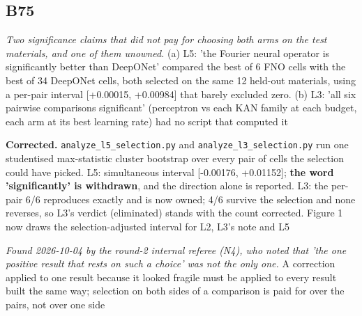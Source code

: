 \documentclass[10pt]{article}
\begin{document}
\subsection*{B75}\label{led:B75}
\begin{description}[leftmargin=0pt,itemsep=1pt]
\item[Defect.] \emph{Two significance claims that did not pay for choosing both arms on the test materials, and one of them unowned.} (a) L5: 'the Fourier neural operator is significantly better than DeepONet' compared the best of 6 FNO cells with the best of 34 DeepONet cells, both selected on the same 12 held-out materials, using a per-pair interval [+0.00015, +0.00984] that barely excluded zero. (b) L3: 'all six pairwise comparisons significant' (perceptron vs each KAN family at each budget, each arm at its best learning rate) had no script that computed it
\item[Resolution.] \textbf{Corrected.} \texttt{analyze\_l5\_selection.py} and \texttt{analyze\_l3\_selection.py} run one studentised max-statistic cluster bootstrap over every pair of cells the selection could have picked. L5: simultaneous interval [-0.00176, +0.01152]; \textbf{the word 'significantly' is withdrawn}, and the direction alone is reported. L3: the per-pair 6/6 reproduces exactly and is now owned; 4/6 survive the selection and none reverses, so L3's verdict (eliminated) stands with the count corrected. Figure 1 now draws the selection-adjusted interval for L2, L3's note and L5
\item[Note.] \emph{Found 2026-10-04 by the round-2 internal referee (N4), who noted that 'the one positive result that rests on such a choice' was not the only one.} A correction applied to one result because it looked fragile must be applied to every result built the same way; selection on both sides of a comparison is paid for over the pairs, not over one side
\end{description}
\end{document}
